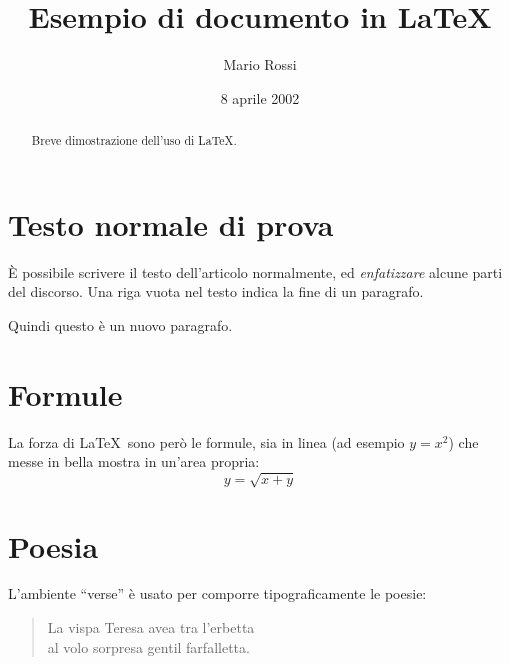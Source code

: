 \documentclass[a4paper,12pt]{article} %
\title{Esempio di documento in \LaTeX} %
\author{Mario Rossi}
\date{8 aprile 2002}
\begin{document}
\maketitle %

\begin{abstract} %
Breve dimostrazione dell'uso di \LaTeX.
\end{abstract} %

\tableofcontents %

\section{Testo normale di prova} %
È possibile scrivere il testo dell'articolo normalmente, ed 
\emph{enfatizzare} alcune parti del discorso. %
Una riga vuota nel testo indica la fine di un paragrafo.

Quindi questo è un nuovo paragrafo.

\section{Formule} %
La forza di \LaTeX\ sono però le formule, sia in linea (ad esempio \(y=x^2\))
 che messe in bella mostra in un'area propria:
\[y=\sqrt{x+y}\]

\section{Poesia} %
L'ambiente ``verse'' è usato per comporre tipograficamente le poesie:
\begin{verse}
La vispa Teresa avea tra l'erbetta\\ %
al volo sorpresa gentil farfalletta.
\end{verse}
\end{document}
